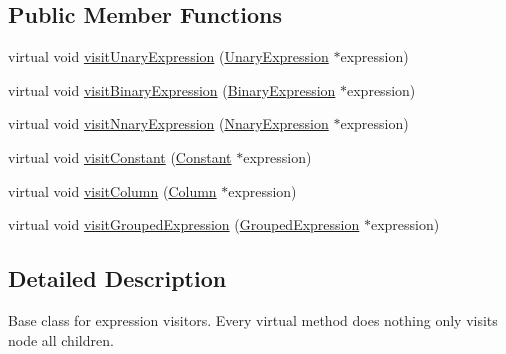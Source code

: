 \subsection*{Public Member Functions}
\begin{DoxyCompactItemize}
\item 
virtual void \hyperlink{class_expression_visitor_base_a9750397f5588263509a28ca9f17e8bc4}{visit\+Unary\+Expression} (\hyperlink{class_unary_expression}{Unary\+Expression} $\ast$expression)
\item 
virtual void \hyperlink{class_expression_visitor_base_aebbbbe9a1cecabe4c4804bf1ef82a9f9}{visit\+Binary\+Expression} (\hyperlink{class_binary_expression}{Binary\+Expression} $\ast$expression)
\item 
virtual void \hyperlink{class_expression_visitor_base_a010c5ba36b255c8576a2b36aaf9692d8}{visit\+Nnary\+Expression} (\hyperlink{class_nnary_expression}{Nnary\+Expression} $\ast$expression)
\item 
virtual void \hyperlink{class_expression_visitor_base_a64921e6a6a4945faf693e9ef8d6310a4}{visit\+Constant} (\hyperlink{class_constant}{Constant} $\ast$expression)
\item 
virtual void \hyperlink{class_expression_visitor_base_a1ac638b82248ff9e1582dbf520dc6ae4}{visit\+Column} (\hyperlink{class_column}{Column} $\ast$expression)
\item 
virtual void \hyperlink{class_expression_visitor_base_aec22a7bb476fc79e7997d188423514c0}{visit\+Grouped\+Expression} (\hyperlink{class_grouped_expression}{Grouped\+Expression} $\ast$expression)
\end{DoxyCompactItemize}


\subsection{Detailed Description}
Base class for expression visitors. Every virtual method does nothing only visits node all children. 

